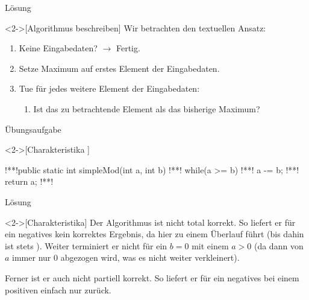 \begin{frame}[c]{Lösung}
    \begin{solve}<2->[Algorithmus beschreiben]
        \pause{}Wir betrachten den textuellen Ansatz: \begin{enumerate}[<+(1)->]
            \item Keine Eingabedaten? \(\to\) Fertig.
            \item Setze Maximum auf erstes Element der Eingabedaten.
            \item Tue für jedes weitere Element der Eingabedaten: \begin{enumerate}
                \item Ist das zu betrachtende Element  als das bisherige Maximum? 
            \end{enumerate}
        \end{enumerate}
    \end{solve}
\end{frame}

\begin{frame}[c,fragile]{Übungsaufgabe}
    \begin{exercise}<2->[Charakteristika ]
        \begin{plainjava}
!**!public static int simpleMod(int a, int b){
!**!    while(a >= b)
!**!        a -= b;
!**!    return a;
!**!}
        \end{plainjava}
    \end{exercise}
\end{frame}

\begin{frame}[c]{Lösung}
    \begin{solve}<2->[Charakteristika]
       \pause{}Der Algorithmus ist nicht total korrekt.\pause{} So liefert er für ein negatives  kein korrektes Ergebnis,\pause{} da hier  zu einem Überlauf führt (bis dahin ist stets ). Weiter terminiert er nicht für ein \(b = 0\) mit einem \(a > 0\) (da dann von \(a\) immer nur \(0\) abgezogen wird, was es nicht weiter verkleinert).\medskip\par
       \pause{}Ferner ist er auch nicht partiell korrekt.\pause{} So liefert er für ein negatives  bei einem positiven  einfach nur  zurück.
    \end{solve}
\end{frame}

